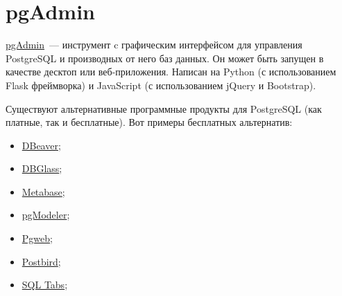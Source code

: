 \section{pgAdmin}

\href{https://www.pgadmin.org/}{pgAdmin}~--- инструмент c графическим интерфейсом для управления PostgreSQL и производных от него баз данных. Он может быть запущен в качестве десктоп или веб-приложения. Написан на Python (с использованием Flask фреймворка) и JavaScript (с использованием jQuery и Bootstrap).

Существуют альтернативные программные продукты для PostgreSQL (как платные, так и бесплатные). Вот примеры бесплатных альтернатив:

\begin{itemize}
  \item \href{http://dbeaver.jkiss.org/}{DBeaver};
  \item \href{http://dbglass.web-pal.com/}{DBGlass};
  \item \href{http://www.metabase.com/}{Metabase};
  \item \href{http://pgmodeler.com.br/}{pgModeler};
  \item \href{http://sosedoff.github.io/pgweb/}{Pgweb};
  \item \href{https://github.com/Paxa/postbird}{Postbird};
  \item \href{http://www.sqltabs.com/}{SQL Tabs};
\end{itemize}
